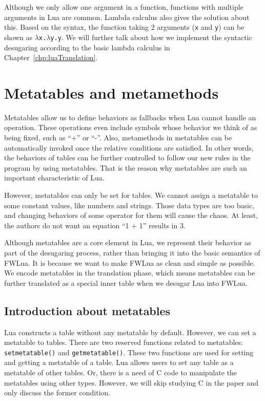 Although we only allow one argument in a function, functions with multiple arguments in Lua are common. Lambda calculus also gives the solution about this. Based on the syntax, the function taking 2 arguments ({\tt x} and {\tt y}) can be shown as {\tt $\lambda$x.$\lambda$y.y}. We will further talk about how we implement the syntactic desugaring according to the basic lambda calculus in Chapter~\ref{chp:luaTranslation}.


\section{Metatables and metamethods}
Metatables allow us to define behaviors as fallbacks when Lua cannot handle an operation. These operations even include symbols whose behavior we think of as being fixed, such as ``+'' or ``-''.
Also, metamethods in metatables can be automatically invoked once the relative conditions are satisfied. In other words, the behaviors of tables can be further controlled to follow our new rules in the program by using metatables. That is the reason why metatables are such an important characteristic of Lua.

However, metatables can only be set for tables. We cannot assign a metatable to some constant values, like numbers and strings. Those data types are too basic, and changing behaviors of some operator for them will cause the chaos. At least, the authors do not want an equation ``1 + 1'' results in 3. 

Although metatables are a core element in Lua, we represent their behavior as part of the desugaring process, rather than bringing it into the basic semantics of FWLua.
It is because we want to make FWLua as clean and simple as possible.
We encode metatables in the translation phase, which means metatables can be further translated as a special inner table when we desugar Lua into FWLua.

\subsection{Introduction about metatables}
Lua constructs a table without any metatable by default.
However, we can set a metatable to tables.
There are two reserved functions related to metatables: {\tt setmetatable()} and {\tt getmetatable()}. These two functions are used for setting and getting a metatable of a table. 
Lua allows users to set any table as a metatable of other tables. Or, there is a need of C code to manipulate the metatables using other types. However, we will skip studying C in the paper and only discuss the former condition.

